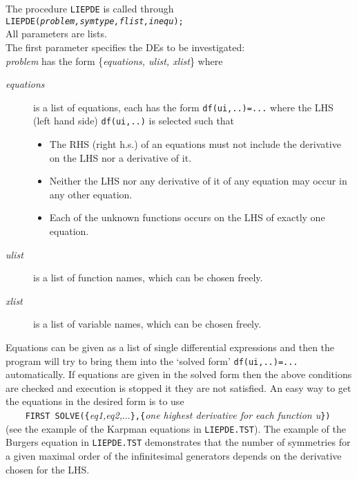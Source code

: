 The procedure \texttt{LIEPDE} is called through \\
\texttt{LIEPDE(\textit{problem,symtype,flist,inequ}); } \\
All parameters are lists.  \\[6pt]
The first parameter specifies the DEs to be investigated: \\
\textit{problem} has the form \{\textit{equations, ulist, xlist}\} where
\begin{description}
\item[\textit{equations}] is a list of equations, each has the form
  \texttt{df(ui,..)=...} where the LHS (left hand side)
  \texttt{df(ui,..)} is selected such that
  \begin{itemize}
  \item The RHS (right h.s.) of an equations must not include the
    derivative on the LHS nor a derivative of it.
  \item Neither the LHS nor any derivative of it of any equation may
    occur in any other equation.
  \item Each of the unknown functions occurs on the LHS of exactly one
    equation.
  \end{itemize}
\item[\textit{ulist}] is a list of function names, which can be chosen freely.
\item[\textit{xlist}] is a list of variable names, which can be chosen freely.
\end{description}
Equations can be given as a list of single differential expressions and then
the program will try to bring them into the `solved form' \texttt{df(ui,..)=...}
automatically. If equations are given in the solved form then the above
conditions are checked and execution is stopped it they are not satisfied.
An easy way to get the equations in the desired form is to use \\
\verb+    FIRST SOLVE({+\textit{eq1,eq2,}...\verb+},{+\textit{one highest
derivative for each function u}\verb+})+  \\
(see the example of the Karpman equations in \texttt{LIEPDE.TST}).
The example of the Burgers equation in \texttt{LIEPDE.TST} demonstrates
that the number of symmetries for a given maximal order of the infinitesimal
generators depends on the derivative chosen for the LHS.

